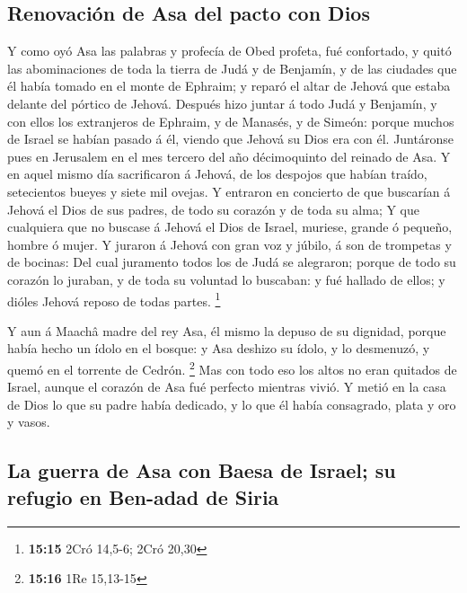 \hypertarget{renovaciuxf3n-de-asa-del-pacto-con-dios}{%
\subsection{Renovación de Asa del pacto con
Dios}\label{renovaciuxf3n-de-asa-del-pacto-con-dios}}

 Y como oyó Asa las palabras y profecía de Obed profeta,
fué confortado, y quitó las abominaciones de toda la tierra de Judá y de
Benjamín, y de las ciudades que él había tomado en el monte de Ephraim;
y reparó el altar de Jehová que estaba delante del pórtico de Jehová.
 Después hizo juntar á todo Judá y Benjamín, y con ellos
los extranjeros de Ephraim, y de Manasés, y de Simeón: porque muchos de
Israel se habían pasado á él, viendo que Jehová su Dios era con él.
 Juntáronse pues en Jerusalem en el mes tercero del año
décimoquinto del reinado de Asa.  Y en aquel mismo día
sacrificaron á Jehová, de los despojos que habían traído, setecientos
bueyes y siete mil ovejas.  Y entraron en concierto de
que buscarían á Jehová el Dios de sus padres, de todo su corazón y de
toda su alma;  Y que cualquiera que no buscase á Jehová
el Dios de Israel, muriese, grande ó pequeño, hombre ó mujer.
 Y juraron á Jehová con gran voz y júbilo, á son de
trompetas y de bocinas:  Del cual juramento todos los de
Judá se alegraron; porque de todo su corazón lo juraban, y de toda su
voluntad lo buscaban: y fué hallado de ellos; y dióles Jehová reposo de
todas partes. \footnote{\textbf{15:15} 2Cró 14,5-6; 2Cró 20,30}

 Y aun á Maachâ madre del rey Asa, él mismo la depuso de
su dignidad, porque había hecho un ídolo en el bosque: y Asa deshizo su
ídolo, y lo desmenuzó, y quemó en el torrente de Cedrón. \footnote{\textbf{15:16}
  1Re 15,13-15}  Mas con todo eso los altos no eran
quitados de Israel, aunque el corazón de Asa fué perfecto mientras
vivió.  Y metió en la casa de Dios lo que su padre había
dedicado, y lo que él había consagrado, plata y oro y vasos.

\hypertarget{la-guerra-de-asa-con-baesa-de-israel-su-refugio-en-ben-adad-de-siria}{%
\subsection{La guerra de Asa con Baesa de Israel; su refugio en Ben-adad
de
Siria}\label{la-guerra-de-asa-con-baesa-de-israel-su-refugio-en-ben-adad-de-siria}}

